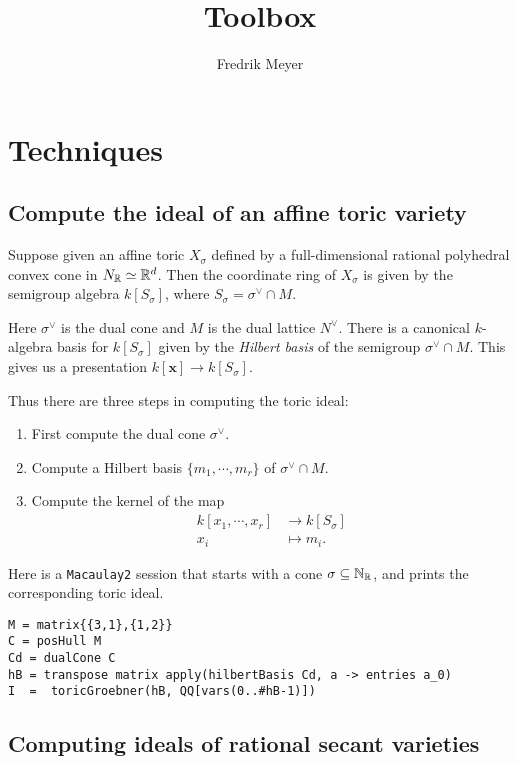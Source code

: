 \documentclass[11pt, english]{article}
\title{Toolbox}
\author{Fredrik Meyer}
\begin{document}
\maketitle 

\section{Techniques}
\subsection{Compute the ideal of an affine toric variety}

Suppose given an affine toric $X_\sigma$ defined by a full-dimensional rational polyhedral convex cone in $N_{\mathbb{R}} \simeq \mathbb{R}^d$. Then the coordinate ring of $X_\sigma$ is given by the semigroup algebra $k[S_\sigma]$, where $S_\sigma = \sigma^\vee \cap M$.

Here $\sigma^\vee$ is the dual cone and $M$ is the dual lattice $N^\vee$. There is a canonical $k$-algebra basis for $k[S_\sigma]$ given by the \emph{Hilbert basis} of the semigroup $\sigma^\vee \cap M$. This gives us a presentation $k[\mathbf x] \to k[S_\sigma]$.

Thus there are three steps in computing the toric ideal:
\begin{enumerate}
\item First compute the dual cone $\sigma^\vee$.
\item Compute a Hilbert basis $\{m_1,\cdots,m_r\}$ of $\sigma^\vee \cap M$.
\item Compute the kernel of the map 
  \begin{align*}
    k[x_1,\cdots, x_r] &\to k[S_\sigma]  \\
 x_i &\mapsto m_i.
  \end{align*}
\end{enumerate}

Here is a \verb|Macaulay2| session that starts with a cone $\sigma \subseteq \mathbb{N}_{\mathbb{R}}$, and prints the corresponding toric ideal.

\begin{verbatim}
M = matrix{{3,1},{1,2}}
C = posHull M
Cd = dualCone C
hB = transpose matrix apply(hilbertBasis Cd, a -> entries a_0)
I  =  toricGroebner(hB, QQ[vars(0..#hB-1)])
\end{verbatim}


\subsection{Computing ideals of rational secant varieties}
\end{document}
